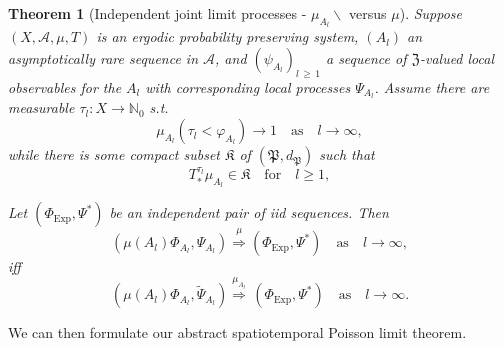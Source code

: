 \documentclass[10pt]{amsart}
\newtheorem{theo}{Theorem}[section]
\theoremstyle{definition}\newtheorem{defi}[theo]{Definition}\newtheorem{rema}[theo]{Remark}\newtheorem{exam}[theo]{Example}\newtheorem{exem}[theo]{Example}\newtheorem{nota}[theo]{Notation}
\newcommand{\clA}{\mathcal{A}}
\newcommand{\Expl}{\mathrm{Exp}}
\newcommand{\frkK}{\mathfrak{K}}
\newcommand{\frkP}{\mathfrak{P}}
\newcommand{\frkZ}{\mathfrak{Z}}
\newcommand{\bbN}{\mathbb{N}}
\begin{document}
\begin{theo}[{Independent joint limit processes - $\mu_{A_{l}}\backslash$ versus $\mu$}]\label{T_JointLimitProcMuVsMuA}
Suppose $(X,\clA,\mu,T)$ is an ergodic probability preserving system, $(A_{l})$ an asymptotically rare sequence in $\clA$, and $(\psi_{A_{l}})_{l\,\geq\,1}$ a sequence of $\frkZ$-valued local observables for the $A_{l}$ with corresponding local processes $\Psi_{A_{l}}$. Assume there are measurable $\tau _{l}:X\rightarrow\bbN_{0}$ s.t.
\begin{equation}\label{Eq_mnhjnggnfjfggnjf1}
\mu_{A_{l}}\left(\tau_{l}<\varphi_{A_{l}}\right) \longrightarrow 1\quad\text{as}\quad l\rightarrow\infty,
\end{equation}
while there is some compact subset $\frkK$ of $(\frkP,d_{\frkP})$ such that
\begin{equation}\label{Eq_mnhjnggnfjfggnjf2}
T_{\ast}^{\tau_{l}}\mu_{A_{l}}\in\frkK\quad \text{for}\quad l\geq1,
\end{equation}


Let $(\Phi_{\Expl},\Psi^{\ast})$ be an independent pair of iid sequences. Then
\begin{equation}
\left(\mu(A_{l})\Phi_{A_{l}},\Psi_{A_{l}}\right)\overset{\mu}{\Longrightarrow} \left(\Phi_{\Expl},\Psi^{\ast}\right)\quad\text{as}\quad l\rightarrow\infty,
\end{equation}
iff
\begin{equation}\label{Eq_jomiasanmimradldo}
\left(\mu(A_{l})\Phi_{A_{l}},\widetilde{\Psi}_{A_{l}}\right)\overset{\mu_{A_{l}} }{\Longrightarrow}\,\left(\Phi_{\Expl},\Psi^{\ast}\right)\quad\text{as}\quad l\rightarrow\infty.
\end{equation}
\end{theo}



We can then formulate our abstract spatiotemporal Poisson limit theorem.
\end{document}
